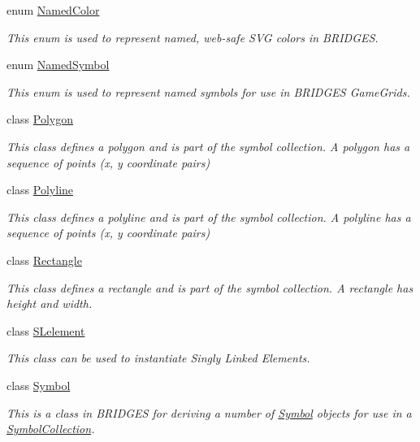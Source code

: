 \begin{DoxyCompactItemize}
enum \hyperlink{enumbridges_1_1base_1_1_named_color}{Named\+Color}
\begin{DoxyCompactList}\small\item\em This enum is used to represent named, web-\/safe S\+VG colors in B\+R\+I\+D\+G\+ES. \end{DoxyCompactList}\item 
enum \hyperlink{enumbridges_1_1base_1_1_named_symbol}{Named\+Symbol}
\begin{DoxyCompactList}\small\item\em This enum is used to represent named symbols for use in B\+R\+I\+D\+G\+ES Game\+Grids. \end{DoxyCompactList}\item 
class \hyperlink{classbridges_1_1base_1_1_polygon}{Polygon}
\begin{DoxyCompactList}\small\item\em This class defines a polygon and is part of the symbol collection. A polygon has a sequence of points (x, y coordinate pairs) \end{DoxyCompactList}\item 
class \hyperlink{classbridges_1_1base_1_1_polyline}{Polyline}
\begin{DoxyCompactList}\small\item\em This class defines a polyline and is part of the symbol collection. A polyline has a sequence of points (x, y coordinate pairs) \end{DoxyCompactList}\item 
class \hyperlink{classbridges_1_1base_1_1_rectangle}{Rectangle}
\begin{DoxyCompactList}\small\item\em This class defines a rectangle and is part of the symbol collection. A rectangle has height and width. \end{DoxyCompactList}\item 
class \hyperlink{classbridges_1_1base_1_1_s_lelement}{S\+Lelement}
\begin{DoxyCompactList}\small\item\em This class can be used to instantiate Singly Linked Elements. \end{DoxyCompactList}\item 
class \hyperlink{classbridges_1_1base_1_1_symbol}{Symbol}
\begin{DoxyCompactList}\small\item\em This is a class in B\+R\+I\+D\+G\+ES for deriving a number of \hyperlink{classbridges_1_1base_1_1_symbol}{Symbol} objects for use in a \hyperlink{classbridges_1_1base_1_1_symbol_collection}{Symbol\+Collection}. \end{DoxyCompactList}\item 

\end{DoxyCompactItemize}
